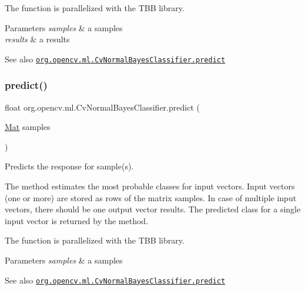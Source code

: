 The function is parallelized with the T\+BB library.


\begin{DoxyParams}{Parameters}
{\em samples} & a samples \\
\hline
{\em results} & a results\\
\hline
\end{DoxyParams}
\begin{DoxySeeAlso}{See also}
\href{http://docs.opencv.org/modules/ml/doc/normal_bayes_classifier.html#cvnormalbayesclassifier-predict}{\tt org.\+opencv.\+ml.\+Cv\+Normal\+Bayes\+Classifier.\+predict} 
\end{DoxySeeAlso}
\mbox{\label{classorg_1_1opencv_1_1ml_1_1_cv_normal_bayes_classifier_aa27915628eb042dc68ab7a1bd97b94f8}} 
\subsubsection{\texorpdfstring{predict()}{predict()}\hspace{0.1cm}{\footnotesize\ttfamily [2/2]}}
{\footnotesize\ttfamily float org.\+opencv.\+ml.\+Cv\+Normal\+Bayes\+Classifier.\+predict (\begin{DoxyParamCaption}\item[{\mbox{\hyperlink{classorg_1_1opencv_1_1core_1_1_mat}{Mat}}}]{samples }\end{DoxyParamCaption})}

Predicts the response for sample(s).

The method estimates the most probable classes for input vectors. Input vectors (one or more) are stored as rows of the matrix {\ttfamily samples}. In case of multiple input vectors, there should be one output vector {\ttfamily results}. The predicted class for a single input vector is returned by the method.

The function is parallelized with the T\+BB library.


\begin{DoxyParams}{Parameters}
{\em samples} & a samples\\
\hline
\end{DoxyParams}
\begin{DoxySeeAlso}{See also}
\href{http://docs.opencv.org/modules/ml/doc/normal_bayes_classifier.html#cvnormalbayesclassifier-predict}{\tt org.\+opencv.\+ml.\+Cv\+Normal\+Bayes\+Classifier.\+predict} 
\end{DoxySeeAlso}
\mbox{\label{classorg_1_1opencv_1_1ml_1_1_cv_normal_bayes_classifier_a89391c9f8a1d8b796b83000e74f155e1}} 
